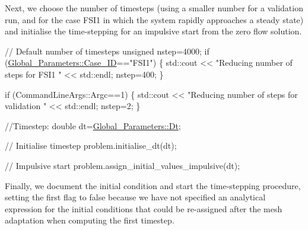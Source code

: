 Next, we choose the number of timesteps (using a smaller number for a validation run, and for the case F\+S\+I1 in which the system rapidly approaches a steady state) and initialise the time-\/stepping for an impulsive start from the zero flow solution.


\begin{DoxyCodeInclude}

 \textcolor{comment}{// Default number of timesteps}
 \textcolor{keywordtype}{unsigned} nstep=4000;
 \textcolor{keywordflow}{if} (\hyperlink{namespaceGlobal__Parameters_a887474a9be53363806b4de417f660dba}{Global\_Parameters::Case\_ID}==\textcolor{stringliteral}{"FSI1"})
  \{
   std::cout << \textcolor{stringliteral}{"Reducing number of steps for FSI1 "} << std::endl;
   nstep=400;
  \}

 \textcolor{keywordflow}{if} (CommandLineArgs::Argc==1)
  \{
   std::cout << \textcolor{stringliteral}{"Reducing number of steps for validation "} << std::endl;
   nstep=2;
  \}

 \textcolor{comment}{//Timestep: }
 \textcolor{keywordtype}{double} dt=\hyperlink{namespaceGlobal__Parameters_ab29c9f716872de235c78e62bce2c4109}{Global\_Parameters::Dt};

 \textcolor{comment}{// Initialise timestep }
 problem.initialise\_dt(dt);

 \textcolor{comment}{// Impulsive start}
 problem.assign\_initial\_values\_impulsive(dt);

\end{DoxyCodeInclude}


Finally, we document the initial condition and start the time-\/stepping procedure, setting the {\ttfamily first} flag to {\ttfamily false} because we have not specified an analytical expression for the initial conditions that could be re-\/assigned after the mesh adaptation when computing the first timestep.


